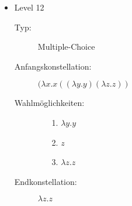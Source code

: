 \begin{itemize}
	\item{Level 12} 
		\begin{description}
			\item[Typ:] Multiple-Choice 
			\item[Anfangskonstellation:] \((\lambda x . x ((\lambda y . y) (\lambda z . z ) ) \)    
			\item[Wahlmöglichkeiten:] \hfill
				\begin{itemize}
					\item[1.] \( \lambda y . y\) 
					\item[2.] \( z \) 
					\item[3.] \(\lambda z . z \)
				\end{itemize}
			\item[Endkonstellation:]\( \lambda z . z\)
		\end{description}


\end{itemize}
